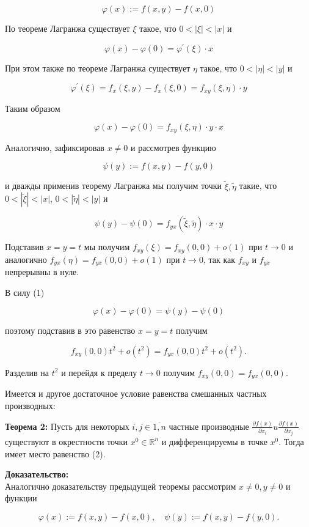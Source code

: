 \documentclass[a4paper,12pt]{article} %
\begin{document}
$$
\varphi(x):=f(x, y)-f(x, 0)
$$

По теореме Лагранжа существует $\xi$ такое, что $0<|\xi|<|x|$ и

$$
\varphi(x)-\varphi(0)=\varphi^{\prime}(\xi) \cdot x
$$

При этом также по теореме Лагранжа существует $\eta$ такое, что $0<|\eta|<|y|$ и

$$
\varphi^{\prime}(\xi)=f_{x}(\xi, y)-f_{x}(\xi, 0)=f_{x y}(\xi, \eta) \cdot y
$$

Таким образом

$$
\varphi(x)-\varphi(0)=f_{x y}(\xi, \eta) \cdot y \cdot x
$$

Аналогично, зафиксировав $x \neq 0$ и рассмотрев функцию

$$
\psi(y):=f(x, y)-f(y, 0)
$$

и дважды применив теорему Лагранжа мы получим точки $\tilde{\xi}, \tilde{\eta}$ такие, что $0<|\tilde{\xi}|<|x|$, $0<|\tilde{\eta}|<|y|$ и

$$
\psi(y)-\psi(0)=f_{y x}(\tilde{\xi}, \tilde{\eta}) \cdot x \cdot y
$$

Подставив $x=y=t$ мы получим $f_{x y}(\xi)=f_{x y}(0,0)+o(1)$ при $t \rightarrow 0$ и аналогично $f_{y x}(\eta)=f_{y x}(0,0)+o(1)$ при $t \rightarrow 0$, так как $f_{x y}$ и $f_{y x}$ непрерывны в нуле.

В силу (1)

$$
\varphi(x)-\varphi(0)=\psi(y)-\psi(0)
$$

поэтому подставив в это равенство $x=y=t$ получим

$$
f_{x y}(0,0) t^{2}+o\left(t^{2}\right)=f_{y x}(0,0) t^{2}+o\left(t^{2}\right) .
$$

Разделив на $t^{2}$ и перейдя к пределу $t \rightarrow 0$ получим $f_{x y}(0,0)=f_{y x}(0,0)$.

Имеется и другое достаточное условие равенства смешанных частных производных:

\textbf{Теорема 2:} Пусть для некоторых $i, j \in \overline{1, n}$ частные производные $\frac{\partial f(x)}{\partial x_{i}} u \frac{\partial f(x)}{\partial x_{j}}$ существуют в окрестности точки $x^{0} \in \mathbb{R}^{n}$ и дифференцируемы в точке $x^{0}$. Тогда имеет место равенство (2).

\textbf{Доказательство:}\\
Аналогично доказательству предыдущей теоремы рассмотрим $x \neq 0, y \neq 0$ и функции

$$
\varphi(x):=f(x, y)-f(x, 0), \quad \psi(y):=f(x, y)-f(y, 0) .
$$
\end{document}
